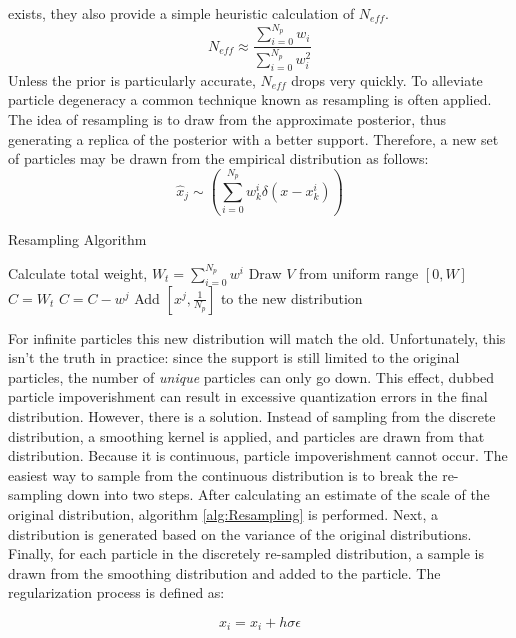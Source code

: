 exists, they also provide a simple heuristic calculation of $N_{eff}$.
\begin{equation}
N_{eff} \approx \frac{\sum_{i=0}^{N_p} w_i}{\sum_{i=0}^{N_p} w_i^2}
\label{eq:neff}
\end{equation}
Unless the prior is particularly accurate,
$N_{eff}$ drops very quickly.  To alleviate particle degeneracy
a common technique known as resampling is often applied. The idea of resampling is to 
draw from the approximate posterior, thus generating a replica of the posterior with 
a better support. Therefore, a new set of particles may be drawn from the empirical
distribution as follows:
\begin{equation}
\hat{x}_j \sim \left(\sum_{i=0}^{N_p} w^i_k\delta(x - x^i_k)\right)
\end{equation}

\begin{algorithm}
\caption{Resampling Algorithm}
\begin{algorithmic}
\STATE Calculate total weight, $W_t = \sum_{i=0}^{N_p} w^i$
    \STATE Draw $V$ from uniform range $[0, W]$
    \STATE $C = W_t$
        \STATE $C = C - w^j$
    \ENDFOR
    \STATE Add $[x^j, \frac{1}{N_p}]$ to the new distribution
\ENDFOR
\STATE 
\end{algorithmic}
\label{alg:Resampling}
\end{algorithm}
For infinite particles this new distribution will match the old.
Unfortunately, this isn't the truth in practice: since the support is
still limited to the original particles, the number of \emph{unique} particles can only go down.
This effect, dubbed particle impoverishment can result in excessive quantization
errors in the final distribution. However, there is a solution. Instead of sampling from the
discrete distribution, a smoothing kernel is applied, and particles are drawn from
that distribution. Because it is continuous, particle impoverishment
cannot occur. The easiest way to sample from the continuous distribution is to break the 
re-sampling down into two steps. After calculating an estimate of the scale of the original
distribution, algorithm \autoref{alg:Resampling} is performed. Next, a distribution is generated
based on the variance of the original distributions.
Finally, for each particle in the discretely re-sampled distribution, a sample is drawn from 
the smoothing 
distribution and added to the particle.  The regularization process is defined as:

\begin{equation}
x_i = x_i + h\sigma \epsilon
\end{equation}

